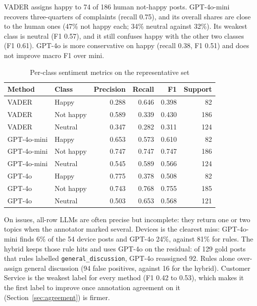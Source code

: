 \documentclass[11pt,a4paper]{article}
\begin{document}
VADER assigns happy to 74 of 186 human not-happy posts. GPT-4o-mini recovers three-quarters of complaints (recall 0.75), and its overall shares are close to the human ones (47\% not happy each; 34\% neutral against 32\%). Its weakest class is neutral (F1 0.57), and it still confuses happy with the other two classes (F1 0.61). GPT-4o is more conservative on happy (recall 0.38, F1 0.51) and does not improve macro F1 over mini.

\begin{table}[H]
\centering
\caption{Per-class sentiment metrics on the representative set}
\label{tab:sentclass}
\begin{tabular}{llrrrr}
\toprule
\textbf{Method} & \textbf{Class} & \textbf{Precision} & \textbf{Recall} & \textbf{F1} & \textbf{Support} \\
\midrule
VADER & Happy & 0.288 & 0.646 & 0.398 & 82 \\
VADER & Not happy & 0.589 & 0.339 & 0.430 & 186 \\
VADER & Neutral & 0.347 & 0.282 & 0.311 & 124 \\
GPT-4o-mini & Happy & 0.653 & 0.573 & 0.610 & 82 \\
GPT-4o-mini & Not happy & 0.747 & 0.747 & 0.747 & 186 \\
GPT-4o-mini & Neutral & 0.545 & 0.589 & 0.566 & 124 \\
GPT-4o & Happy & 0.775 & 0.378 & 0.508 & 82 \\
GPT-4o & Not happy & 0.743 & 0.768 & 0.755 & 185 \\
GPT-4o & Neutral & 0.503 & 0.653 & 0.568 & 121 \\
\bottomrule
\end{tabular}
\end{table}

On issues, all-row LLMs are often precise but incomplete: they return one or two topics when the annotator marked several. Devices is the clearest miss: GPT-4o-mini finds 6\% of the 54 device posts and GPT-4o 24\%, against 81\% for rules. The hybrid keeps those rule hits and uses GPT-4o on the residual: of 129 gold posts that rules labelled \texttt{general\_discussion}, GPT-4o reassigned 92. Rules alone over-assign general discussion (94 false positives, against 16 for the hybrid). Customer Service is the weakest label for every method (F1 0.42 to 0.53), which makes it the first label to improve once annotation agreement on it (Section~\ref{sec:agreement}) is firmer.
\end{document}

